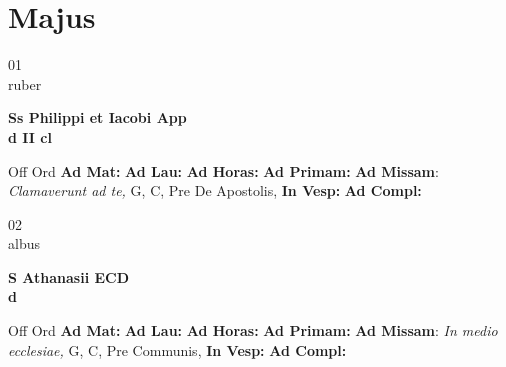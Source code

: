\documentclass[10pt, openany]{book}
\begin{document}
    \chapter{Majus}
                    
    \begin{center}
        \begin{minipage}{3.5in}
            \vspace{2em}
            \begin{minipage}{0.5in}
                {\Huge 01} \\
                {\normalsize ruber}
            \end{minipage}
            \begin{minipage}{3.0in}
                \textbf{ \large Ss Philippi et Iacobi App \\
                \textnormal{\normalsize d II cl}}

            \end{minipage}
            \begin{justify}Off Ord
                \textbf{Ad Mat: }
                \textbf{Ad Lau: }
                \textbf{Ad Horas: }
                \textbf{Ad Primam: }\textbf{Ad Missam}: \textit{Clamaverunt ad te,} G, C, Pre De Apostolis, 
                \textbf{In Vesp: }
                \textbf{Ad Compl: }
            \end{justify}
        \end{minipage}
    \end{center}

    \begin{center}
        \begin{minipage}{3.5in}
            \vspace{2em}
            \begin{minipage}{0.5in}
                {\Huge 02} \\
                {\normalsize albus}
            \end{minipage}
            \begin{minipage}{3.0in}
                \textbf{ \large S Athanasii ECD \\
                \textnormal{\normalsize d}}

            \end{minipage}
            \begin{justify}Off Ord
                \textbf{Ad Mat: }
                \textbf{Ad Lau: }
                \textbf{Ad Horas: }
                \textbf{Ad Primam: }\textbf{Ad Missam}: \textit{In medio ecclesiae,} G, C, Pre Communis, 
                \textbf{In Vesp: }
                \textbf{Ad Compl: }
            \end{justify}
        \end{minipage}
    \end{center}
\end{document}
